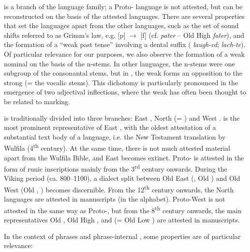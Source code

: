 \begin{refsection}
 is a branch of the  language family; a Proto- language is not attested, but can be reconstructed on the basis of the attested  languages. There are several properties that set the  languages apart from the other  languages, such as the set of sound shifts referred to as Grimm’s law, e.g. [p] $\rightarrow$ [f] (cf.  \textit{pater} – Old High  \textit{fater}), and the formation of a ``weak past tense'' involving a dental suffix ( \textit{laugh-ed};  \textit{lach-te}). Of particular relevance for our purposes, we also observe the formation of a weak nominal  on the basis of the  n-stems. In other  languages, the n-stems were one subgroup of the consonantal stems, but in , the weak  forms an opposition to the strong  (= the vocalic stems). This dichotomy is particularly pronounced in the emergence of two adjectival inflections, where the weak  has often been thought to be related to  marking. 

 is traditionally divided into three branches: East , North  (= ) and West .  is the most prominent representative of East , with the oldest attestation of a substantial text body of a  language, i.e. the New Testament translation by Wulfila (4\textsuperscript{th} century). At the same time, there is not much attested material apart from the Wulfila Bible, and East  becomes extinct. Proto- is attested in the form of runic inscriptions mainly from the 3\textsuperscript{rd} century onwards. During the Viking period (ca. 800--1100), a dialect split between Old East  (, Old ) and Old West  (Old , ) becomes discernible. From the 12\textsuperscript{th} century onwards, the North  languages are attested in manuscripts (in the  alphabet). Proto-West  is not attested in the same way as Proto-, but from the 8\textsuperscript{th} century onwards, the main representatives Old , Old High , and  (= Old Low ) are attested in manuscripts.  

In the context of  phrases and  phrase-internal , some properties are of particular relevance: 




\end{refsection}
